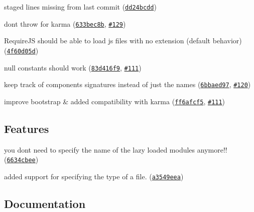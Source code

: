 \begin{DoxyItemize}
\item staged lines missing from last commit (\href{https://github.com/ocombe/ocLazyLoad/commit/dd24bcdd573821ce7def60c173a15cbee2540de7}{\tt dd24bcdd})
\item don\textquotesingle{}t throw for karma (\href{https://github.com/ocombe/ocLazyLoad/commit/633bec8b38635e7d78aaa0e4ea8f1a8cdb85050e}{\tt 633bec8b}, \href{https://github.com/ocombe/ocLazyLoad/issues/129}{\tt \#129})
\item Require\+JS should be able to load js files with no extension (default behavior) (\href{https://github.com/ocombe/ocLazyLoad/commit/4f60d05d02039b700908545b60b71c3e2ca9bbf6}{\tt 4f60d05d})
\item null constants should work (\href{https://github.com/ocombe/ocLazyLoad/commit/83d416f97d357d148efe97bafbaf2836ed7b3a3d}{\tt 83d416f9}, \href{https://github.com/ocombe/ocLazyLoad/issues/111}{\tt \#111})
\item keep track of components signatures instead of just the names (\href{https://github.com/ocombe/ocLazyLoad/commit/6bbaed971cf2d23bb35a6ba5f29c6e6162edc5b5}{\tt 6bbaed97}, \href{https://github.com/ocombe/ocLazyLoad/issues/120}{\tt \#120})
\item improve bootstrap \& added compatibility with karma (\href{https://github.com/ocombe/ocLazyLoad/commit/ff6afcf5d3ef00e8e931fd548051f3103225cea8}{\tt ff6afcf5}, \href{https://github.com/ocombe/ocLazyLoad/issues/111}{\tt \#111})
\end{DoxyItemize}

\subsection*{Features}


\begin{DoxyItemize}
\item you don\textquotesingle{}t need to specify the name of the lazy loaded modules anymore!! (\href{https://github.com/ocombe/ocLazyLoad/commit/6634cbee6c5ce84363be84ae5529a61a633585b5}{\tt 6634cbee})
\item added support for specifying the type of a file. (\href{https://github.com/ocombe/ocLazyLoad/commit/a3549eea93c67cfc4881ebe9d44c73c220790461}{\tt a3549eea})
\end{DoxyItemize}

\subsection*{Documentation}


